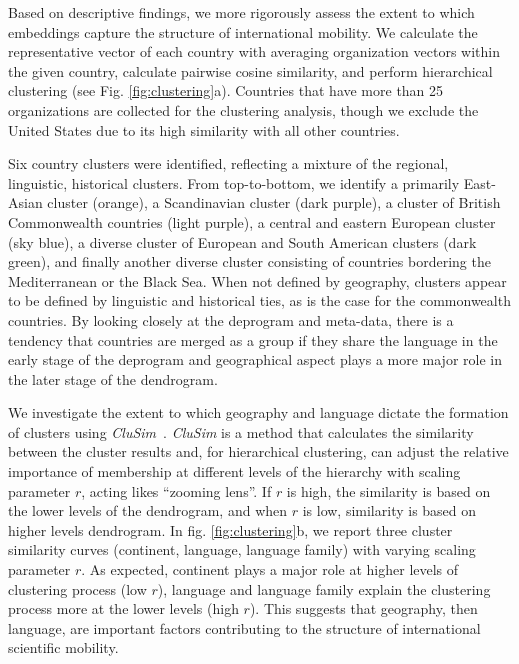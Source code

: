 \documentclass[12pt]{article} %
\begin{document}
Based on descriptive findings, we more rigorously assess the extent to which embeddings capture the structure of international mobility. 
We calculate the representative vector of each country with averaging organization vectors within the given country, calculate pairwise cosine similarity, and perform hierarchical clustering (see Fig. \ref{fig:clustering}a).
Countries that have more than 25 organizations are collected for the clustering analysis, though we exclude the United States due to its high similarity with all other countries.

Six country clusters were identified, reflecting a mixture of the regional, linguistic, historical clusters. 
From top-to-bottom, we identify a primarily East-Asian cluster (orange), a Scandinavian cluster (dark purple), a cluster of British Commonwealth countries (light purple), a central and eastern European cluster (sky blue), a diverse cluster of European and South American clusters (dark green), and finally another diverse cluster consisting of countries bordering the Mediterranean or the Black Sea.
When not defined by geography, clusters appear to be defined by linguistic and historical ties, as is the case for the commonwealth countries. 
By looking closely at the deprogram and meta-data, there is a tendency that countries are merged as a group if they share the language in the early stage of the deprogram and geographical aspect plays a more major role in the later stage of the dendrogram.

We investigate the extent to which geography and language dictate the formation of clusters using \textit{CluSim}~\autocite{gates2019element}.
\textit{CluSim} is a method that calculates the similarity between the cluster results and, for hierarchical clustering, can adjust the relative importance of membership at different levels of the hierarchy with scaling parameter $r$, acting likes ``zooming lens''.  
If $r$ is high, the similarity is based on the lower levels of the dendrogram, and when $r$ is low, similarity is based on higher levels dendrogram. 
In fig. \ref{fig:clustering}b, we report three cluster similarity curves (continent, language, language family) with varying scaling parameter $r$.
As expected, continent plays a major role at higher levels of clustering process (low $r$), language and language family explain the clustering process more at the lower levels (high $r$). 
This suggests that geography, then language, are important factors contributing to the structure of international scientific mobility.
\end{document}

